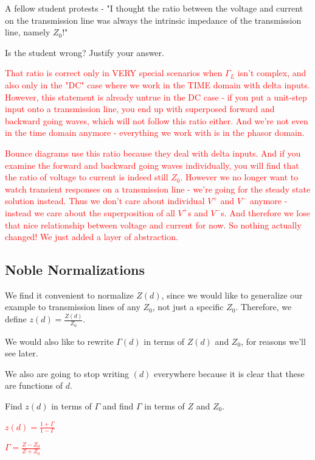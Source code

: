 \documentclass{article}
\begin{document}
A fellow student protests - "I thought the ratio between the voltage and current on the transmission line was always the intrinsic impedance of the transmission line, namely $Z_0$!"

Is the student wrong? Justify your answer.

\textcolor{red}{That ratio is correct only in VERY special scenarios when $\Gamma_L$ isn't complex, and also only in the "DC" case where we work in the TIME domain with delta inputs. However, this statement is already untrue in the DC case - if you put a unit-step input onto a transmission line, you end up with superposed forward and backward going waves, which will not follow this ratio either. And we're not even in the time domain anymore - everything we work with is in the phasor domain.}

\textcolor{red}{Bounce diagrams use this ratio because they deal with delta inputs. And if you examine the forward and backward going waves individually, you will find that the ratio of voltage to current is indeed still $Z_0$. However we no longer want to watch transient responses on a transmission line - we're going for the steady state solution instead. Thus we don't care about individual $V^+$ and $V^-$ anymore - instead we care about the superposition of all $V^+$s and $V^-$s. And therefore we lose that nice relationship between voltage and current for now. So nothing actually changed! We just added a layer of abstraction.}

\vfill

\subsection{Noble Normalizations}

We find it convenient to normalize $Z(d)$, since we would like to generalize our example to transmission lines of any $Z_0$, not just a specific $Z_0$. Therefore, we define $z(d) = \frac{Z(d)}{Z_0}$.

We would also like to rewrite $\Gamma(d)$ in terms of $Z(d)$ and $Z_0$, for reasons we'll see later.

We also are going to stop writing $(d)$ everywhere because it is clear that these are functions of $d$.

Find $z(d)$ in terms of $\Gamma$ and find $\Gamma$ in terms of $Z$ and $Z_0$.

\textcolor{red}{$z(d) = \frac{1 + \Gamma}{1 - \Gamma}$}

\textcolor{red}{$\Gamma = \frac{Z - Z_0}{Z + Z_0}$}
\end{document}
